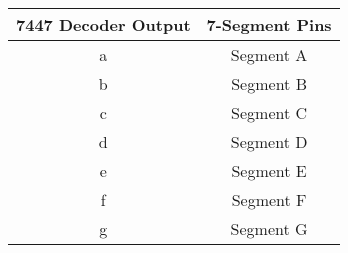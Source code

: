 \begin{table}[h]
    \centering
    \begin{tabular}{|c|c|}
        \hline
        \textbf{7447 Decoder Output} & \textbf{7-Segment Pins} \\
        \hline
        a & Segment A \\
        b & Segment B \\
        c & Segment C \\
        d & Segment D \\
        e & Segment E \\
        f & Segment F \\
        g & Segment G \\
        \hline
    \end{tabular}
\end{table}

